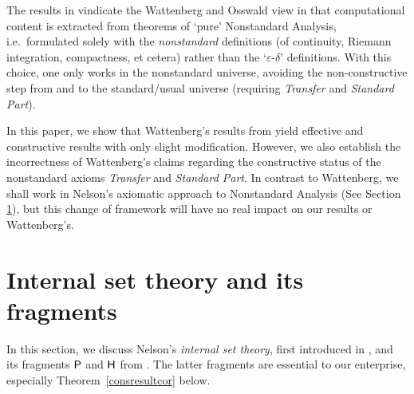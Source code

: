 \documentclass[reqno]{amsart}
\def\H{\textup{\textsf{H}}}
\def\P{\textup{\textsf{P}}}
\def\eps{\varepsilon}
\numberwithin{equation}{section}
\numberwithin{thm}{section}
\begin{document}
\medskip

The results in \cites{samGH, samzoo, samzooII, sambon} vindicate the Wattenberg and Osswald view in that computational content is extracted from theorems of `pure' Nonstandard Analysis, i.e.\ formulated solely with the \emph{nonstandard} definitions (of continuity, Riemann integration, compactness, et cetera) rather than the `$\eps$-$\delta$' definitions.  
With this choice, one only works in the nonstandard universe, avoiding the non-constructive step from and to the standard/usual universe (requiring \emph{Transfer} and \emph{Standard Part}). 

\medskip

In this paper, we show that Wattenberg's results from \cite{watje} yield effective and constructive results with only slight modification.  However, we also establish the incorrectness of Wattenberg's claims regarding the constructive status of the nonstandard axioms \emph{Transfer} and \emph{Standard Part}.  
In contrast to Wattenberg, we shall work in Nelson's axiomatic approach to Nonstandard Analysis (See Section \ref{P}), but this change of framework will have no real impact on our results or Wattenberg's.      


\section{Internal set theory and its fragments}\label{P}
In this section, we discuss Nelson's \emph{internal set theory}, first introduced in \cite{wownelly}, and its fragments $\P$ and $\H$ from \cite{brie}.  
The latter fragments are essential to our enterprise, especially Theorem~\ref{consresultcor} below.  
\end{document}
